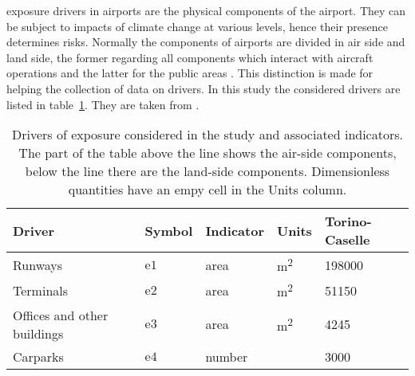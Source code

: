 \Gls{exposure} \glspl{driver} in airports are the physical components of the airport. They can be subject to \glspl{impact} of climate change at various levels, hence their presence determines \glspl{risk}. Normally the components of airports are divided in air side and land side, the former regarding all components which interact with aircraft operations and the latter for the public areas \cite[553]{2022DeVivoRiskAssessment}. This distinction is made for helping the collection of data on drivers.
In this study the considered drivers are listed in table~\ref{tab:drivers_exposure}. They are taken from \cite[554]{2022DeVivoRiskAssessment}.
\begin{table}[h]
  \centering
  \caption{Drivers of exposure considered in the study and associated indicators. The part of the table above the line shows the air-side components, below the line there are the land-side components. Dimensionless quantities have an empy cell in the Units column.}
  \label{tab:drivers_exposure}
  \begin{tabular}{p{}llll}
    Driver                      & Symbol        & Indicator & Units                & Torino-Caselle \\
    \hline
    Runways                     & $\mathrm{e1}$ & area      & \unit{\square\metre} & 198000         \\
    \hline
    Terminals                   & $\mathrm{e2}$ & area      & \unit{\square\metre} & 51150          \\
    Offices and other buildings & $\mathrm{e3}$ & area      & \unit{\square\metre} & 4245           \\
    Carparks                    & $\mathrm{e4}$ & number    &                      & 3000           \\
  \end{tabular}
\end{table}

